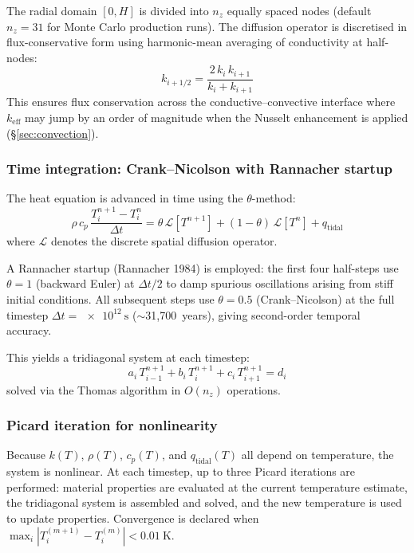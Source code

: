 \documentclass[11pt,a4paper]{article}
\begin{document}
The radial domain $[0, H]$ is divided into $n_z$ equally spaced nodes
(default $n_z = 31$ for Monte Carlo production runs). The diffusion
operator is discretised in flux-conservative form using harmonic-mean
averaging of conductivity at half-nodes:
\begin{equation}
k_{i+1/2} = \frac{2\,k_i\,k_{i+1}}{k_i + k_{i+1}}
\label{eq:harmonic}
\end{equation}
This ensures flux conservation across the conductive--convective
interface where $k_{\mathrm{eff}}$ may jump by an order of magnitude
when the Nusselt enhancement is applied (\S\ref{sec:convection}).

\subsubsection{Time integration: Crank--Nicolson with Rannacher startup}

The heat equation is advanced in time using the $\theta$-method:
\begin{equation}
\rho\,c_p\,\frac{T^{n+1}_i - T^n_i}{\Delta t}
  = \theta\,\mathcal{L}[T^{n+1}]
  + (1-\theta)\,\mathcal{L}[T^n]
  + q_{\mathrm{tidal}}
\label{eq:theta}
\end{equation}
where $\mathcal{L}$ denotes the discrete spatial diffusion operator.

A Rannacher startup (Rannacher 1984) is employed: the first four
half-steps use $\theta = 1$ (backward Euler) at $\Delta t/2$ to damp
spurious oscillations arising from stiff initial conditions. All
subsequent steps use $\theta = 0.5$ (Crank--Nicolson) at the full
timestep $\Delta t = \SI{e12}{\second}$ ($\sim$31,700~years), giving
second-order temporal accuracy.

This yields a tridiagonal system at each timestep:
\begin{equation}
a_i\,T^{n+1}_{i-1} + b_i\,T^{n+1}_i + c_i\,T^{n+1}_{i+1} = d_i
\label{eq:tridiag}
\end{equation}
solved via the Thomas algorithm in $O(n_z)$ operations.

\subsubsection{Picard iteration for nonlinearity}

Because $k(T)$, $\rho(T)$, $c_p(T)$, and $q_{\mathrm{tidal}}(T)$ all
depend on temperature, the system is nonlinear. At each timestep, up to
three Picard iterations are performed: material properties are evaluated
at the current temperature estimate, the tridiagonal system is assembled
and solved, and the new temperature is used to update properties.
Convergence is declared when
$\max_i |T^{(m+1)}_i - T^{(m)}_i| < \SI{0.01}{\kelvin}$.
\end{document}
